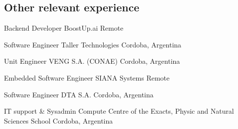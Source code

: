 \subsection{Other relevant experience}

    {Backend Developer} %
    {BoostUp.ai} %
    {Remote} %
    {}
    {}

    {Software Engineer} %
    {Taller Technologies} %
    {Cordoba, Argentina} %
    {}
    {}

    {Unit Engineer} %
    {VENG S.A. (CONAE)} %
    {Cordoba, Argentina} %
    {}
    {}

    {Embedded Software Engineer} %
    {SIANA Systems} %
    {Remote} %
    {}
    {}

    {Software Engineer} %
    {DTA S.A.} %
    {Cordoba, Argentina} %
    {}
    {}

    {IT support \& Sysadmin} %
    {Compute Centre of the Exacts, Physic and Natural Sciences School} %
    {Cordoba, Argentina} %
    {}
    {}

